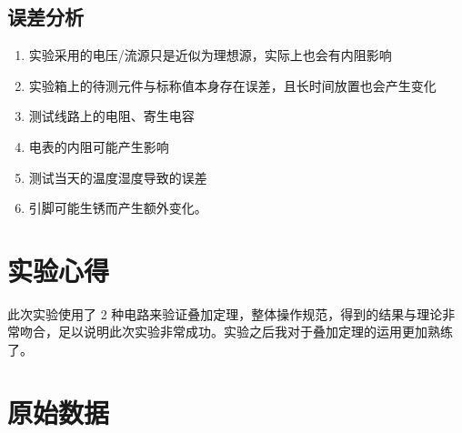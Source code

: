 \documentclass[a4paper,utf8]{article}
\begin{document}
    \subsection{误差分析}
        \begin{enumerate}
            \item 实验采用的电压/流源只是近似为理想源，实际上也会有内阻影响
            \item 实验箱上的待测元件与标称值本身存在误差，且长时间放置也会产生变化
            \item 测试线路上的电阻、寄生电容
            \item 电表的内阻可能产生影响
            \item 测试当天的温度湿度导致的误差
            \item 引脚可能生锈而产生额外变化。
        \end{enumerate}
\section{实验心得}
    此次实验使用了 2 种电路来验证叠加定理，整体操作规范，得到的结果与理论非常吻合，足以说明此次实验非常成功。实验之后我对于叠加定理的运用更加熟练了。

\section{原始数据}
    \begin{center}
    \end{center}
\end{document}
